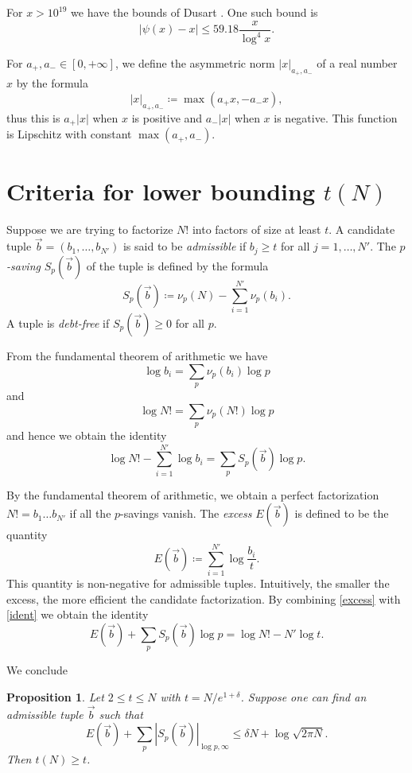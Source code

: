 \documentclass[12pt,a4paper,reqno]{amsart}
\numberwithin{equation}{section}
\theoremstyle{plain}
\newtheorem{proposition}[theorem]{Proposition}
\theoremstyle{definition}
\begin{document}
  For $x > 10^{19}$ we have the bounds of Dusart \cite{dusart}.  One such bound is
  $$ |\psi(x) - x| \leq 59.18 \frac{x}{\log^4 x}.$$
  
  For $a_+,a_- \in [0,+\infty]$, we define the asymmetric norm $|x|_{a_+,a_-}$ of a real number $x$ by the formula
  $$ |x|_{a_+,a_-} \coloneqq \max(a_+ x, -a_- x),$$
thus this is $a_+ |x|$ when $x$ is positive and $a_- |x|$ when $x$ is negative.  This function is Lipschitz with constant $\max(a_+,a_-)$.
  
\section{Criteria for lower bounding $t(N)$}

Suppose we are trying to factorize $N!$ into factors of size at least $t$.  A candidate tuple $\vec b = (b_1,\dots,b_{N'})$ is said to be \emph{admissible} if $b_j \geq t$ for all $j=1,\dots,N'$.  The \emph{$p$-saving} $S_p(\vec b)$ of the tuple is defined by the formula
$$ S_p(\vec b) \coloneqq \nu_p(N) - \sum_{i=1}^{N'} \nu_p(b_i).$$
A tuple is \emph{debt-free} if $S_p(\vec b) \geq 0$ for all $p$.

From the fundamental theorem of arithmetic we have
$$ \log b_i = \sum_p \nu_p(b_i) \log p$$
and 
$$ \log N! = \sum_p \nu_p(N!) \log p$$
and hence we obtain the identity 
\begin{equation}\label{ident}
   \log N! - \sum_{i=1}^{N'} \log b_i = \sum_p S_p(\vec b) \log p.
\end{equation}

By the fundamental theorem of arithmetic, we obtain a perfect factorization $N! = b_1 \dots b_{N'}$ if all the $p$-savings vanish.  The \emph{excess} $E(\vec b)$ is defined to be the quantity
\begin{equation}\label{excess} 
  E(\vec b) \coloneqq \sum_{i=1}^{N'} \log \frac{b_i}{t}.
\end{equation}
This quantity is non-negative for admissible tuples.  Intuitively, the smaller the excess, the more efficient the candidate factorization.  By combining \eqref{excess} with \eqref{ident} we obtain the identity
\begin{equation}\label{excess-save}
  E(\vec b) + \sum_p S_p(\vec b) \log p = \log N! - N' \log t.
\end{equation}

We conclude

\begin{proposition}  Let $2 \leq t \leq N$ with $t = N /e^{1+\delta}$.  Suppose one can find an admissible tuple $\vec b$ such that
\begin{equation}\label{main} 
  E(\vec b) + \sum_p |S_p(\vec b)|_{\log p,\infty}  \leq \delta N + \log \sqrt{2\pi N}.
\end{equation}
Then $t(N) \geq t$.
\end{proposition}
\end{document}
